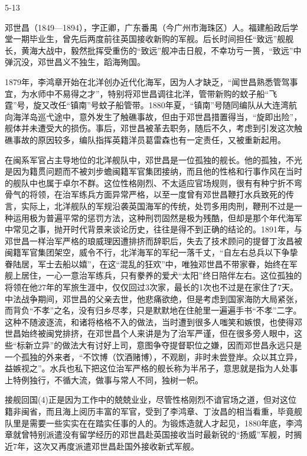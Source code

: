 \documentclass[12pt,UTF8]{ctexbook}
\begin{document}
5-13

邓世昌（1849—1894），字正卿，广东番禺（今广州市海珠区）人。福建船政后学堂一期毕业生，曾先后两度前往英国接收新购的军舰。后长时间担任“致远”舰舰长，黄海大战中，毅然批挥受重伤的“致远”舰冲击日舰，不幸功亏一篑，“致远”中弹沉没，邓世昌义不独生，蹈海殉国。

1879年，李鸿章开始在北洋创办近代化海军，因为人才缺乏，“闻世昌熟悉管驾事宜，为水师中不易得之才”，特别将邓世昌调往北洋，管带新购的蚊子船“飞霆”号，旋又改任“镇南”号蚊子船管带。1880年夏，“镇南”号随同编队从大连湾航向海洋岛巡弋途中，意外发生了触礁事故，但由于邓世昌措置得当，“旋即出险”，舰体并未遭受大的损伤。事后，邓世昌被革去职务，随后不久，考虑到引发这次触礁事故的原因较多，编队指挥英籍洋员葛雷森也有一定责任，又被重新起用。

在闽系军官占主导地位的北洋舰队中，邓世昌是一位孤独的舰长。他的孤独，不光是因为籍贯问题而不被刘步蟾闽籍军官集团接纳，而且他的性格和行事作风在当时的舰队中也属于卓尔不群。这位性格刚烈、不太适应官场规则，很有有种宁折不弯骨气的将领，在治军练兵方面异常严格，以至一度曾有邓世昌鞭打水兵致死的传言，实际上，北洋舰队的军规沿袭英国海军的传统，处罚多用肉刑，鞭刑不过是一种运用极为普遍平常的惩罚方法，这种刑罚固然是极为残酷，但却是那个年代海军中常见之事，抛开时代背景来谈论历史，往往是得不到正确的结论的。1891年，与邓世昌一样治军严格的琅威理因遭排挤而辞职后，失去了技术顾问的提督丁汝昌被闽籍军官集团架空，威令不行，北洋海军的军纪一落千丈，“自左右总兵以下争挚眷陆居，军士去船以嬉”，在这“混乱的狂欢”中，唯独邓世昌不带家眷，始终在军舰上居住，一心一意治军练兵，只有豢养的爱犬“太阳”终日陪伴左右。这位孤独的将领在他27年的军旅生涯中，仅仅回过3次家，最长的1次也不过是在家住了7天。中法战争期间，邓世昌的父亲去世，他悲痛欲绝，但是考虑到国家海防大局紧张，而背负“不孝”之名，没有归乡尽孝，只是默默地在住舱里一遍遍手书“不孝”二字。这种不随波逐流，和诸将格格不入的做法，当时遭到很多人嗤笑和嫉恨，也使得邓世昌始终被闽党排挤，在邓世昌个人来讲是为了治军严谨，但在很多旁人眼中，这些“标新立异”的做法大有讨好上司，意图争夺提督职位之嫌，因而邓世昌永远只是一个孤独的外来者，“不饮博（饮酒赌博），不观剧，非时未尝登岸。众以其立异，益嫉视之”。水兵也私下把这位治军严格的舰长称为半吊子，意思就是指为人处事上特例独行，不循大流，做事与常人不同，独树一帜。

接舰回国(4)正是因为工作中的兢兢业业，尽管性格刚烈不谙官场之道，但对这位籍非闽省，而且海上阅历丰富的军官，受到了李鸿章、丁汝昌的相当看重，毕竟舰队里是需要一些实实在在踏实任事的人的。为锻炼造就人才起见，1880年底，李鸿章就曾特别派遣没有留学经历的邓世昌赴英国接收当时最新锐的“扬威”军舰，时搁近7年，这次又再度派遣邓世昌赴国外接收新式军舰。
\end{document}
